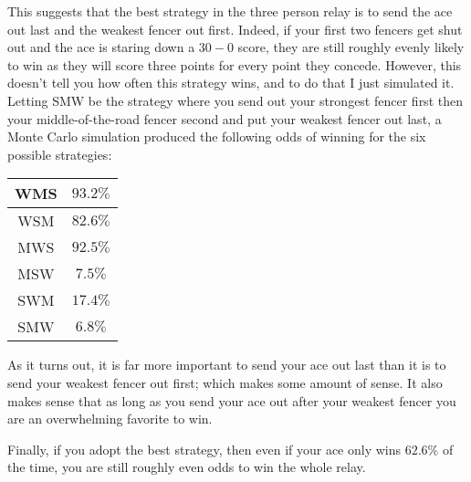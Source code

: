 \documentclass[11pt]{article}
\theoremstyle{definition}
\begin{document}
This suggests that the best strategy in the three person relay is to send the ace out last and the weakest fencer out first.  Indeed, if your first two fencers get shut out and the ace is staring down a $30-0$ score, they are still roughly evenly likely to win as they will score three points for every point they concede.  However, this doesn't tell you how often this strategy wins, and to do that I just simulated it.  Letting SMW be the strategy where you send out your strongest fencer first then your middle-of-the-road fencer second and put your weakest fencer out last, a Monte Carlo simulation produced the following odds of winning for the six possible strategies:
\begin{center}
\begin{tabular}{c|c}
WMS & $93.2\%$\\ \hline
WSM & $82.6\%$ \\ \hline
MWS & $92.5\%$ \\ \hline
MSW & $7.5\%$ \\ \hline
SWM & $17.4\%$ \\ \hline 
SMW & $6.8\%$
\end{tabular}
\end{center}
As it turns out, it is far more important to send your ace out last than it is to send your weakest fencer out first; which makes some amount of sense.  It also makes sense that as long as you send your ace out after your weakest fencer you are an overwhelming favorite to win.

Finally, if you adopt the best strategy, then even if your ace only wins $62.6\%$ of the time, you are still roughly even odds to win the whole relay.
\end{document}
